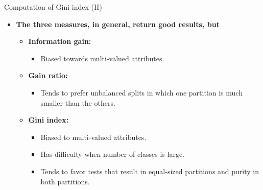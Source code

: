 \documentclass[aspectratio=169,t,table]{beamer}
\begin{document}
  {
    \begin{frame}{Computation of Gini index (II)}
      \begin{itemize}
        \item \textbf{The three measures, in general, return good results, but}
        \begin{itemize}
          \item \textbf{\color{airforceblue}Information gain:}
          \begin{itemize}
            \item Biased towards multi-valued attributes.
          \end{itemize}
          \item \textbf{\color{airforceblue}Gain ratio:}
          \begin{itemize}
            \item Tends to prefer unbalanced splits in which one partition is much smaller than the others.
          \end{itemize}
          \item \textbf{\color{airforceblue}Gini index:}
          \begin{itemize}
            \item Biased to multi-valued attributes.
            \item Has difficulty when number of classes is large.
            \item Tends to favor tests that result in equal-sized partitions and purity in both partitions.
          \end{itemize}
        \end{itemize}
      \end{itemize}
    \end{frame}
  }
\end{document}
